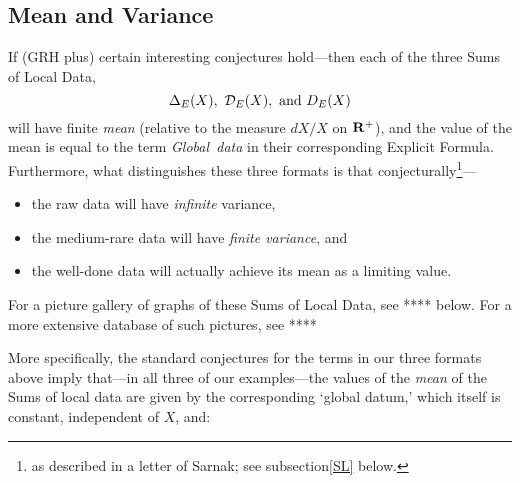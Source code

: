 \documentclass[11pt]{article}
\theoremstyle{plain}
\theoremstyle{definition}
\numberwithin{equation}{section}
\numberwithin{figure}{section}
\numberwithin{table}{section}
\begin{document}
 \subsection{Mean and Variance}
If (GRH plus)  certain interesting conjectures hold---then  each of the three  Sums of Local Data, $${\Delta}_E(X), \ {\mathcal D}_E(X), \ {\rm and} \ D_E(X)$$ will have finite {\it mean}  (relative to the measure $dX/X$ on ${\bf R}^+$), and the value of the mean is equal to the term  {\rm{\it Global\ data}} in their corresponding Explicit Formula. Furthermore, what distinguishes these three formats is that conjecturally{\footnote{ as described in a letter of Sarnak; see subsection{\ref{SL}} below.}}---
   \begin{itemize}
   \item the raw data will have {\it infinite} variance,
   \item the medium-rare data will have {\it finite variance}, and
   \item the well-done data will actually achieve its mean as a limiting value.
   \end{itemize}

   For a picture gallery of graphs of these Sums of Local Data, see **** below. For a more extensive database of such pictures, see ****




   More specifically, the standard conjectures for the terms in our three formats above imply that---in all three of our examples---the values of the  {\it mean}  of the {Sums of local data} are given by the corresponding `global datum,' which itself is constant, independent of $X$, and:
\end{document}
